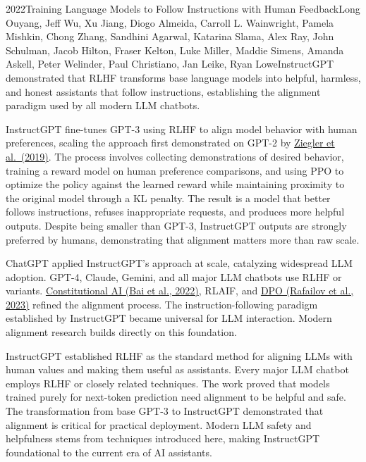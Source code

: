 
\begin{papersummary}{2022}{Training Language Models to Follow Instructions with Human Feedback}{Long Ouyang, Jeff Wu, Xu Jiang, Diogo Almeida, Carroll L. Wainwright, Pamela Mishkin, Chong Zhang, Sandhini Agarwal, Katarina Slama, Alex Ray, John Schulman, Jacob Hilton, Fraser Kelton, Luke Miller, Maddie Simens, Amanda Askell, Peter Welinder, Paul Christiano, Jan Leike, Ryan Lowe}{InstructGPT demonstrated that RLHF transforms base language models into helpful, harmless, and honest assistants that follow instructions, establishing the alignment paradigm used by all modern LLM chatbots.}

InstructGPT fine-tunes GPT-3 using RLHF to align model behavior with human preferences, scaling the approach first demonstrated on GPT-2 by \hyperref[paper:ziegler-2019]{Ziegler et al.\ (2019)}. The process involves collecting demonstrations of desired behavior, training a reward model on human preference comparisons, and using PPO to optimize the policy against the learned reward while maintaining proximity to the original model through a KL penalty. The result is a model that better follows instructions, refuses inappropriate requests, and produces more helpful outputs. Despite being smaller than GPT-3, InstructGPT outputs are strongly preferred by humans, demonstrating that alignment matters more than raw scale.

ChatGPT applied InstructGPT's approach at scale, catalyzing widespread LLM adoption. GPT-4, Claude, Gemini, and all major LLM chatbots use RLHF or variants. \hyperref[paper:bai-2022]{Constitutional AI (Bai et al., 2022)}, RLAIF, and \hyperref[paper:rafailov-2023-dpo]{DPO (Rafailov et al., 2023)} refined the alignment process. The instruction-following paradigm established by InstructGPT became universal for LLM interaction. Modern alignment research builds directly on this foundation.

InstructGPT established RLHF as the standard method for aligning LLMs with human values and making them useful as assistants. Every major LLM chatbot employs RLHF or closely related techniques. The work proved that models trained purely for next-token prediction need alignment to be helpful and safe. The transformation from base GPT-3 to InstructGPT demonstrated that alignment is critical for practical deployment. Modern LLM safety and helpfulness stems from techniques introduced here, making InstructGPT foundational to the current era of AI assistants.

\end{papersummary}
